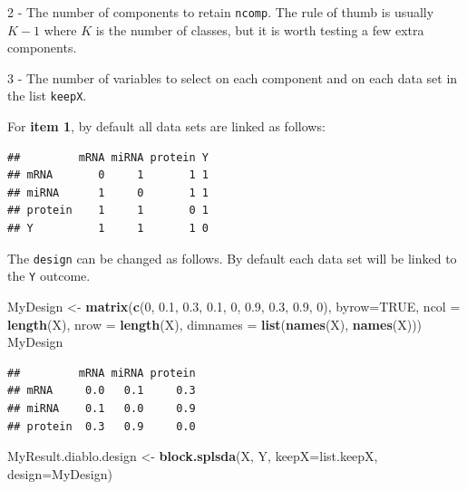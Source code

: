 \documentclass[]{book}
\newenvironment{Shaded}{\begin{snugshade}}{\end{snugshade}}
\newcommand{\DataTypeTok}[1]{\textcolor[rgb]{0.13,0.29,0.53}{#1}}
\newcommand{\DecValTok}[1]{\textcolor[rgb]{0.00,0.00,0.81}{#1}}
\newcommand{\FloatTok}[1]{\textcolor[rgb]{0.00,0.00,0.81}{#1}}
\newcommand{\KeywordTok}[1]{\textcolor[rgb]{0.13,0.29,0.53}{\textbf{#1}}}
\newcommand{\NormalTok}[1]{#1}
\newcommand{\OperatorTok}[1]{\textcolor[rgb]{0.81,0.36,0.00}{\textbf{#1}}}
\newcommand{\OtherTok}[1]{\textcolor[rgb]{0.56,0.35,0.01}{#1}}
\newcommand{\StringTok}[1]{\textcolor[rgb]{0.31,0.60,0.02}{#1}}
\begin{document}
2 - The number of components to retain \texttt{ncomp}. The rule of thumb is usually \(K-1\) where \(K\) is the number of classes, but it is worth testing a few extra components.

3 - The number of variables to select on each component and on each data set in the list \texttt{keepX}.

For \textbf{item 1}, by default all data sets are linked as follows:

\begin{Shaded}
\end{Shaded}

\begin{verbatim}
##         mRNA miRNA protein Y
## mRNA       0     1       1 1
## miRNA      1     0       1 1
## protein    1     1       0 1
## Y          1     1       1 0
\end{verbatim}

The \texttt{design} can be changed as follows. By default each data set will be linked to the \texttt{Y} outcome.

\begin{Shaded}
\begin{Highlighting}[]
\NormalTok{MyDesign <-}\StringTok{ }\KeywordTok{matrix}\NormalTok{(}\KeywordTok{c}\NormalTok{(}\DecValTok{0}\NormalTok{, }\FloatTok{0.1}\NormalTok{, }\FloatTok{0.3}\NormalTok{,}
                     \FloatTok{0.1}\NormalTok{, }\DecValTok{0}\NormalTok{, }\FloatTok{0.9}\NormalTok{,}
                     \FloatTok{0.3}\NormalTok{, }\FloatTok{0.9}\NormalTok{, }\DecValTok{0}\NormalTok{),}
                   \DataTypeTok{byrow=}\OtherTok{TRUE}\NormalTok{,}
                   \DataTypeTok{ncol =} \KeywordTok{length}\NormalTok{(X), }\DataTypeTok{nrow =} \KeywordTok{length}\NormalTok{(X),}
                 \DataTypeTok{dimnames =} \KeywordTok{list}\NormalTok{(}\KeywordTok{names}\NormalTok{(X), }\KeywordTok{names}\NormalTok{(X)))}
\NormalTok{MyDesign}
\end{Highlighting}
\end{Shaded}

\begin{verbatim}
##         mRNA miRNA protein
## mRNA     0.0   0.1     0.3
## miRNA    0.1   0.0     0.9
## protein  0.3   0.9     0.0
\end{verbatim}

\begin{Shaded}
\begin{Highlighting}[]
\NormalTok{MyResult.diablo.design <-}\StringTok{ }\KeywordTok{block.splsda}\NormalTok{(X, Y, }\DataTypeTok{keepX=}\NormalTok{list.keepX, }\DataTypeTok{design=}\NormalTok{MyDesign)}
\end{Highlighting}
\end{Shaded}
\end{document}
